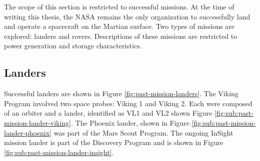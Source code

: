 
The scope of this section is restricted to successful missions. At the time of writing this thesis, the \ac{NASA} remains the only organization to successfully land and operate a spacecraft on the Martian surface. Two types of missions are explored: landers and rovers. Descriptions of these missions are restricted to power generation and storage characteristics.

\subsection{Landers}
\label{sec:StateOfTheArt:PastAndOngoingMissions:Landers}

Successful landers are shown in Figure \ref{fig:past-mission-landers}. The Viking Program involved two space probes: Viking 1 and Viking 2. Each were composed of an orbiter and a lander, identified as \ac{VL1} and \ac{VL2} shown Figure \ref{fig:sub:past-mission-lander-viking}. The Phoenix lander, shown in Figure \ref{fig:sub:past-mission-lander-phoenix} was part of the Mars Scout Program. The ongoing InSight mission lander is part of the Discovery Program and is shown in Figure \ref{fig:sub:past-mission-lander-insight}.

\vspace{0.5cm}

